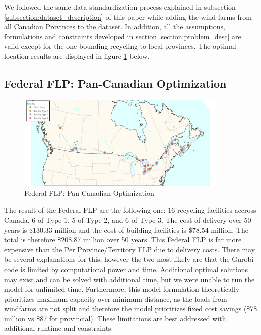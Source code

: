We followed the same data standardization process explained in subsection \ref{subsection:dataset_description} of this paper while adding the wind farms from all Canadian Provinces to the dataset. In addition, all the assumptions, formulations and constraints developed in section \ref{section:problem_desc} are valid except for the one bounding recycling to local provinces. The optimal location results are displayed in figure \ref{fig:fig_can} below. 

\subsection{Federal FLP: Pan-Canadian Optimization}
\begin{figure} [h]
    \centering
    \includegraphics[width=0.9\textwidth]{graphics/fig_can.jpeg}
    \caption{Federal FLP: Pan-Canadian Optimization}
    \label{fig:fig_can}
\end{figure}

The result of the Federal FLP are the following one: 16 recycling facilities accross Canada, 6 of Type 1, 5 of Type 2, and 6 of Type 3. The cost of delivery over 50 years is \$130.33 million and the cost of building facilities is \$78.54 million. The total is therefore \$208.87 million over 50 years. This Federal FLP is far more expensive than the Per Province/Territory FLP due to delivery costs. There may be several explanations for this, however the two most likely are that the Gurobi code is limited by computational power and time. Additional optimal solutions may exist and can be solved with additional time, but we were unable to run the model for unlimited time. Furthermore, this model formulation theoretically prioritizes maximum capacity over minimum distance, as the loads from windfarms are not split and therefore the model prioritizes fixed cost savings (\$78 million vs \$87 for provincial). These limitations are best addressed with additional runtime and constraints. 



